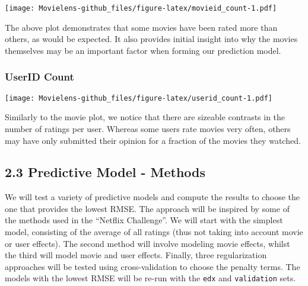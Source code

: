 \documentclass[]{article}
\newenvironment{Shaded}{\begin{snugshade}}{\end{snugshade}}
\newcommand{\DataTypeTok}[1]{\textcolor[rgb]{0.13,0.29,0.53}{#1}}
\newcommand{\DecValTok}[1]{\textcolor[rgb]{0.00,0.00,0.81}{#1}}
\newcommand{\KeywordTok}[1]{\textcolor[rgb]{0.13,0.29,0.53}{\textbf{#1}}}
\newcommand{\NormalTok}[1]{#1}
\newcommand{\OperatorTok}[1]{\textcolor[rgb]{0.81,0.36,0.00}{\textbf{#1}}}
\newcommand{\StringTok}[1]{\textcolor[rgb]{0.31,0.60,0.02}{#1}}
\begin{document}
\texttt{[image: Movielens-github\_files/figure-latex/movieid\_count-1.pdf]}

The above plot demonstrates that some movies have been rated more than
others, as would be expected. It also provides initial insight into why
the movies themselves may be an important factor when forming our
prediction model.

\hypertarget{userid-count}{%
\subsubsection{UserID Count}\label{userid-count}}

\begin{Shaded}
\end{Shaded}

\texttt{[image: Movielens-github\_files/figure-latex/userid\_count-1.pdf]}

Similarly to the movie plot, we notice that there are sizeable contrasts
in the number of ratings per user. Whereas some users rate movies very
often, others may have only submitted their opinion for a fraction of
the movies they watched.

\hypertarget{predictive-model---methods-1}{%
\subsection{2.3 Predictive Model -
Methods}\label{predictive-model---methods-1}}

We will test a variety of predictive models and compute the results to
choose the one that provides the lowest RMSE. The approach will be
inspired by some of the methods used in the ``Netflix Challenge''. We
will start with the simplest model, consisting of the average of all
ratings (thus not taking into account movie or user effects). The second
method will involve modeling movie effects, whilst the third will model
movie and user effects. Finally, three regularization approaches will be
tested using cross-validation to choose the penalty terms. The models
with the lowest RMSE will be re-run with the \texttt{edx} and
\texttt{validation} sets.
\end{document}
